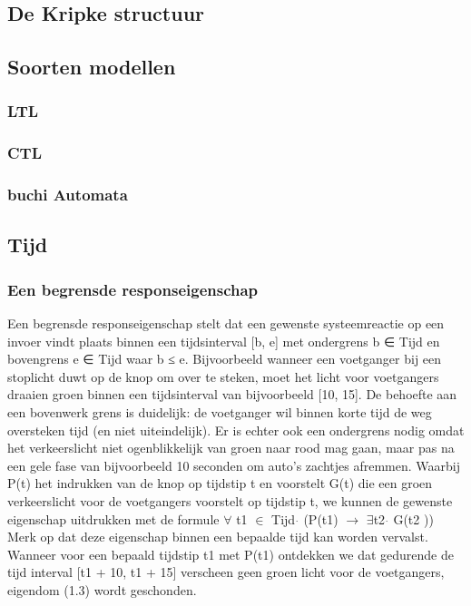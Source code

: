 \documentclass{article}
\begin{document}
	
	\subsection{De Kripke structuur}
	
	\subsection{Soorten modellen}
	
	
	\subsubsection{LTL}
	
	\subsubsection{CTL}
	
	\subsubsection{buchi Automata}
	
	\subsection{Tijd}
	\subsubsection{Een begrensde responseigenschap}
	Een begrensde responseigenschap stelt dat
	een gewenste systeemreactie op een invoer vindt plaats binnen een tijdsinterval
	[b, e] met ondergrens b ∈ Tijd en bovengrens e ∈ Tijd waar
	b ≤ e. Bijvoorbeeld wanneer een voetganger bij een stoplicht duwt
	op de knop om over te steken, moet het licht voor voetgangers draaien
	groen binnen een tijdsinterval van bijvoorbeeld [10, 15]. De behoefte aan een bovenwerk
	grens is duidelijk: de voetganger wil binnen korte tijd de weg oversteken
	tijd (en niet uiteindelijk). Er is echter ook een ondergrens nodig
	omdat het verkeerslicht niet ogenblikkelijk van groen naar rood mag gaan, maar pas na een gele fase van bijvoorbeeld 10 seconden om
	auto's zachtjes afremmen.
	Waarbij P(t) het indrukken van de knop op tijdstip t en voorstelt
	G(t) die een groen verkeerslicht voor de voetgangers voorstelt op tijdstip t,
	we kunnen de gewenste eigenschap uitdrukken met de formule
	$\forall$ t1 $\in$ Tijd $\dot{}$ (P(t1) $\rightarrow$ $\exists$t2 \in [t1 + 10, t1 + 15] $\dot{}$ G(t2 ))
	Merk op dat deze eigenschap binnen een bepaalde tijd kan worden vervalst. Wanneer
	voor een bepaald tijdstip t1 met P(t1) ontdekken we dat gedurende de tijd
	interval [t1 + 10, t1 + 15] verscheen geen groen licht voor de voetgangers,
	eigendom (1.3) wordt geschonden.
\end{document}
